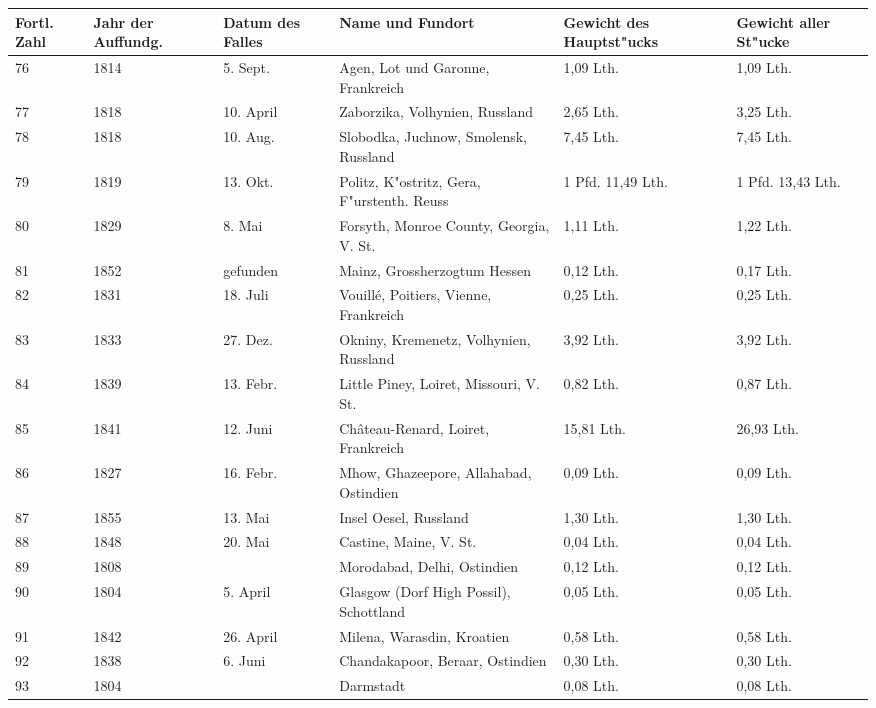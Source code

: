 \documentclass[a4paper, 11pt, oneside]{article}
\begin{document}
\begin{center}
\begin{footnotesize}
\begin{tabular}{ |p{7mm}|p{7mm}|p{13mm}|p{48mm}|p{22mm}|p{22mm}| }
    \hline
    Fortl. Zahl & Jahr der Auffundg. & Datum des Falles & Name und Fundort & Gewicht des Hauptst"ucks & Gewicht aller St"ucke\\
    \hline\hline
    76 & 1814 & 5. Sept. & Agen, Lot und Garonne, Frankreich & 1,09 Lth. & 1,09 Lth.\\\hline
    77 & 1818 & 10. April & Zaborzika, Volhynien, Russland & 2,65 Lth. & 3,25 Lth.\\\hline
    78 & 1818 & 10. Aug. & Slobodka, Juchnow, Smolensk, Russland & 7,45 Lth. & 7,45 Lth.\\\hline
    79 & 1819 & 13. Okt. & Politz, K"ostritz, Gera, F"urstenth. Reuss & 1 Pfd. 11,49 Lth. & 1 Pfd. 13,43 Lth.\\\hline
    80 & 1829 & 8. Mai & Forsyth, Monroe County, Georgia, V. St. & 1,11 Lth. & 1,22 Lth.\\\hline
    81 & 1852 & gefunden & Mainz, Grossherzogtum Hessen & 0,12 Lth. & 0,17 Lth.\\\hline
    82 & 1831 & 18. Juli & Vouillé, Poitiers, Vienne, Frankreich & 0,25 Lth. & 0,25 Lth.\\\hline
    83 & 1833 & 27. Dez. & Okniny, Kremenetz, Volhynien, Russland & 3,92 Lth. & 3,92 Lth.\\\hline
    84 & 1839 & 13. Febr. & Little Piney, Loiret, Missouri, V. St. & 0,82 Lth. & 0,87 Lth.\\\hline
    85 & 1841 & 12. Juni & Château-Renard, Loiret, Frankreich & 15,81 Lth. & 26,93 Lth.\\\hline
    86 & 1827 & 16. Febr. & Mhow, Ghazeepore, Allahabad, Ostindien & 0,09 Lth. & 0,09 Lth.\\\hline
    87 & 1855 & 13. Mai & Insel Oesel, Russland & 1,30 Lth. & 1,30 Lth.\\\hline
    88 & 1848 & 20. Mai & Castine, Maine, V. St. & 0,04 Lth. & 0,04 Lth.\\\hline
    89 & 1808 &  & Morodabad, Delhi, Ostindien & 0,12 Lth. & 0,12 Lth.\\\hline
    90 & 1804 & 5. April & Glasgow (Dorf High Possil), Schottland & 0,05 Lth. & 0,05 Lth.\\\hline
    91 & 1842 & 26. April & Milena, Warasdin, Kroatien & 0,58 Lth. & 0,58 Lth.\\\hline
    92 & 1838 & 6. Juni & Chandakapoor, Beraar, Ostindien & 0,30 Lth. & 0,30 Lth.\\\hline
    93 & 1804 &  & Darmstadt & 0,08 Lth. & 0,08 Lth.\\
    \hline
\end{tabular}
\end{footnotesize}
\end{center}
\end{document}
